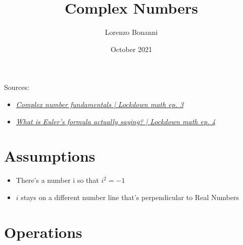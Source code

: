\documentclass[a4paper,12pt,openany,oneside]{article}
\title{Complex Numbers}
\author{Lorenzo Bonanni}
\date{October 2021}
\begin{document}
\maketitle
Sources:
\begin{itemize}
    \item \href{https://youtu.be/5PcpBw5Hbwo}{\color{blue}\textit{Complex number fundamentals | Lockdown math ep. 3}}
    \item \href{https://youtu.be/ZxYOEwM6Wbk}{\color{blue}\textit{What is Euler's formula actually saying? | Lockdown math ep. 4}}
\end{itemize}

\newpage
\section{Assumptions}
\begin{minipage}{.5\textwidth}
    \begin{itemize}
        \item There's a number i so that $i^2=-1$
        \item $i$ stays on a different number line that's perpendicular to Real Numbers
    \end{itemize}
\end{minipage}
\hspace{2cm}%
\begin{minipage}{.2\textwidth}
    \begin{center}
    \end{center}
\end{minipage}


\section{Operations}
\end{document}
